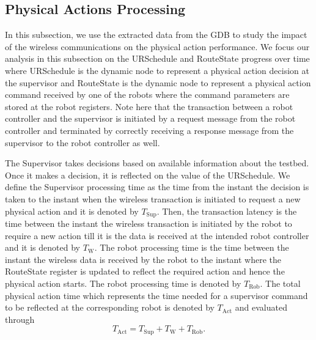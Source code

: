 
\subsection{Physical Actions Processing}
In this subsection, we use the extracted data from the GDB to study the impact of the wireless communications on the physical action performance. We focus our analysis in this subsection on the URSchedule and RouteState progress over time where URSchedule is the dynamic node to represent a physical action decision at the supervisor and RouteState is the dynamic node to represent a physical action command received by one of the robots where the command parameters are stored at the robot registers. Note here that the transaction between a robot controller and the supervisor is initiated by a request message from the robot controller and terminated by correctly receiving a response message from the supervisor to the robot controller as well. 

The Supervisor takes decisions based on available information about the testbed. Once it makes a decision, it is reflected on the value of the URSchedule. We define the Supervisor processing time as the time from the instant the decision is taken to the instant when the wireless transaction is initiated to request a new physical action and it is denoted by $T_\text{Sup}$. Then, the transaction latency is the time between the instant the wireless transaction is initiated by the robot to require a new action till it is the data is received at the intended robot controller and it is denoted by $T_\text{W}$. The robot processing time is the time between the instant the wireless data is received by the robot to the instant where the RouteState register is updated to reflect the required action and hence the physical action starts. The robot processing time is denoted by  $T_\text{Rob}$.  
The total physical action time which represents the time needed for a supervisor command to be reflected at the corresponding robot is denoted by $T_\text{Act}$ and evaluated through
\begin{equation}
T_\text{Act}=T_\text{Sup}+T_\text{W}+T_\text{Rob}.
\end{equation}

